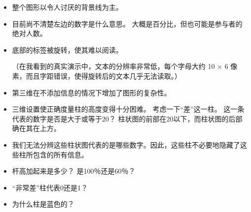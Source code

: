 %
\begin{itemize}
    \item 整个图形以令人讨厌的背景线为主。
    \item 目前尚不清楚左边的数字是什么意思。 大概是百分比，但也可能是参与者的绝对人数。

    \item 底部的标签被旋转，使其难以阅读。
    
    （在我看到的真实演示中，文本的分辨率非常低，每个字母大约 10 × 6 像素，而且字距错误，使得旋转后的文本几乎无法读取。）
    \item 第三维在不添加信息的情况下增加了图形的复杂性。
    \item 三维设置使正确度量柱的高度变得十分困难。 考虑一下``差''这一柱。 这一条代表的数字是否是大于或等于20？ 柱状图的前部在20以下，而柱状图的后部确在其在上方。
    \item 我们无法分辨这些柱状图代表的是哪些数字。因此，这些柱不必要地隐藏了这些柱所包含的所有信息。
    \item 杆高加起来是多少？ 是100％还是60％？
    \item ``非常差''柱代表0还是1？
    \item 为什么柱是蓝色的？
\end{itemize}

